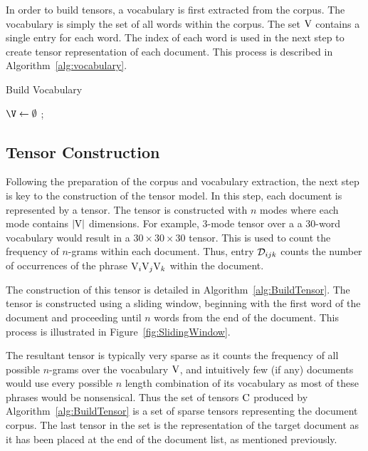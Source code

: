\documentclass[../ut-dissertation.tex]{subfiles}
\begin{document}
In order to build tensors, a vocabulary is first extracted from the
corpus.  The vocabulary is simply the set of all words within the
corpus. The set $\mathrm{V}$ contains a single entry for each word.  The
index of each word is used in the next step to create tensor
representation of each document. This process is described in
Algorithm~\ref{alg:vocabulary}.

\begin{algorithm}[p]
  \caption{Build Vocabulary}
  \label{alg:vocabulary}
  \Output{\V}
  \BlankLine
  $\V\leftarrow\emptyset$\;
  \Return{\V};
\end{algorithm}

\subsection{Tensor Construction}
Following the preparation of the corpus and vocabulary extraction, the
next step is key to the construction of the tensor model.  In this
step, each document is represented by a tensor.  The tensor is
constructed with $n$ modes where each mode contains $|\mathrm{V}|$
dimensions.  For example, 3-mode tensor over a a 30-word vocabulary
would result in a $30 \times 30 \times 30$ tensor. This is used to
count the frequency of $n$-grams within each document.  Thus, entry
$\mathcal{D}_{ijk}$ counts the number of occurrences of the phrase
$\mathrm{V}_i \mathrm{V}_j \mathrm{V}_k$ within the document.


The construction of this tensor is detailed in
Algorithm~\ref{alg:BuildTensor}.  The tensor is constructed using a
sliding window, beginning with the first word of the document
and proceeding until $n$ words from the end of the document.  This
process is illustrated in Figure~\ref{fig:SlidingWindow}.

The resultant tensor is typically very sparse as it counts the
frequency of all possible $n$-grams over the vocabulary $\mathrm{V}$, and
intuitively few (if any) documents would use every possible $n$ length
combination of its vocabulary as most of these phrases would be
nonsensical.  Thus the set of tensors $\mathrm{C}$ produced by
Algorithm~\ref{alg:BuildTensor} is a set of sparse tensors representing
the document corpus.  The last tensor in the set is the representation
of the target document as it has been placed at the end of the
document list, as mentioned previously.
\end{document}
